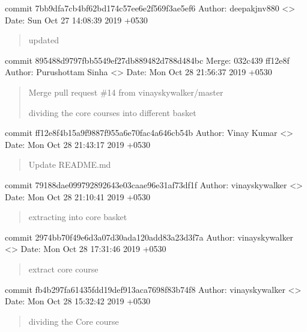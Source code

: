 \documentclass[letterpaper,10pt,english]{sphinxmanual}
\begin{document}
commit 7bb9dfa7cb4bf62bd174c57ee6e2f569f3ae5ef6
Author: deepakjnv880 \textless{}\textgreater{}
Date:   Sun Oct 27 14:08:39 2019 +0530
\begin{quote}

updated
\end{quote}

commit 895488d9797fbb5549ef27db889482d788d484bc
Merge: 032c439 ff12e8f
Author: Purushottam Sinha \textless{}\textgreater{}
Date:   Mon Oct 28 21:56:37 2019 +0530
\begin{quote}

Merge pull request \#14 from vinayskywalker/master

dividing the core courses into different basket
\end{quote}

commit ff12e8f4b15a9f9887f955a6e70fac4a646cb54b
Author: Vinay Kumar \textless{}\textgreater{}
Date:   Mon Oct 28 21:43:17 2019 +0530
\begin{quote}

Update README.md
\end{quote}

commit 79188dae099792892643e03caae96e31af73df1f
Author: vinayskywalker \textless{}\textgreater{}
Date:   Mon Oct 28 21:10:41 2019 +0530
\begin{quote}

extracting into core basket
\end{quote}

commit 2974bb70f49e6d3a07d30ada120add83a23d3f7a
Author: vinayskywalker \textless{}\textgreater{}
Date:   Mon Oct 28 17:31:46 2019 +0530
\begin{quote}

extract core course
\end{quote}

commit fb4b297fa61435fdd19def913aca7698f83b74f8
Author: vinayskywalker \textless{}\textgreater{}
Date:   Mon Oct 28 15:32:42 2019 +0530
\begin{quote}

dividing the Core course
\end{quote}
\end{document}
